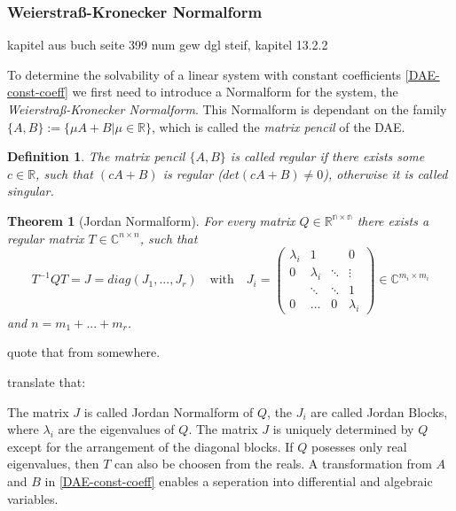 \documentclass[11pt,titlepage]{article}
\newtheorem{definition}{Definition}
\newtheorem{theorem}{Theorem}
\begin{document}
			\subsubsection{Weierstraß-Kronecker Normalform}
				kapitel aus buch seite 399 num gew dgl steif, kapitel 13.2.2
			
				To determine the solvability of a linear system with constant coefficients \ref{DAE-const-coeff} we first need to introduce a Normalform for the system, the \emph{Weierstraß-Kronecker Normalform}. This Normalform is dependant on the family $\{A,B\} := \{ \mu A+B|\mu \in \mathbb{R} \}$, which is called the  \emph{matrix pencil} of the DAE.
				
				\begin{definition}
					The matrix pencil $\{ A,B\}$ is called \emph{regular} if there exists some $c \in \mathbb{R}$, such that $(cA+B)$ is regular ($det(cA+B) \neq 0$), otherwise it is called singular.
				\end{definition}
			
				\begin{theorem}[Jordan Normalform]
					For every matrix $Q \in \mathbb{R^{n \times n}}$ there exists a regular matrix $T \in \mathbb{C}^{n \times n}$, such that
					\begin{displaymath}
						T^{-1}QT = J = diag(J_1, ..., J_r) \quad \text{with} \quad J_i = 
						\left(
						\begin{matrix}
							\lambda_i & 1 & & 0 \\
							0 & \lambda_i & \ddots & \vdots \\
							& \ddots & \ddots & 1 \\
							0 & \hdots & 0 & \lambda_i
						\end{matrix}
						\right)
						\in \mathbb{C}^{m_i \times m_i}
					\end{displaymath} 
					and $n = m_1 + ... + m_r$.
				\end{theorem}
				quote that from somewhere.
				
				translate that:
				
				The matrix $J$ is called Jordan Normalform of $Q$, the $J_i$ are called Jordan Blocks, where $\lambda_i$ are the eigenvalues of $Q$. The matrix $J$ is uniquely determined by $Q$ except for the arrangement of the diagonal blocks. If $Q$ posesses only real eigenvalues, then $T$ can also be choosen from the reals. \newline
				A transformation from $A$ and $B$ in \ref{DAE-const-coeff} enables a seperation into differential and algebraic variables.	
				
\end{document}
